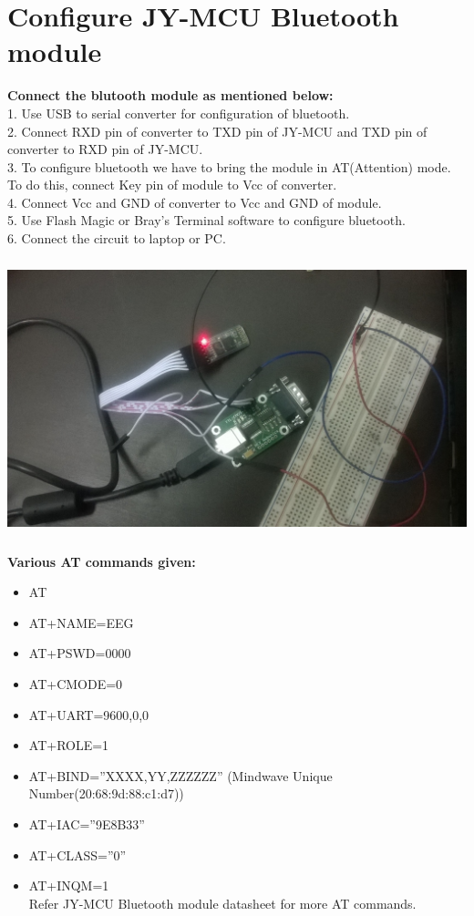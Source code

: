 \documentclass[a4 paper,12pt]{article}
\begin{document}
\begin{minipage}{0.98\textwidth}
	\section{Configure JY-MCU Bluetooth module}
	\vspace{-0.1in}
\textbf{Connect the blutooth module as mentioned below:}\\
1. Use USB to serial converter for configuration of bluetooth.\\
2. Connect RXD pin of converter to TXD pin of JY-MCU and TXD pin of converter to RXD pin of JY-MCU.\\
3. To configure bluetooth we have to bring the module in AT(Attention) mode. To do this, connect Key pin of module to Vcc of converter.\\
4. Connect Vcc and GND of converter to Vcc and GND of module.\\
5. Use Flash Magic or Bray's Terminal software to configure bluetooth.\\
6. Connect the circuit to laptop or PC.

\begin{center}
	\graphicspath{ {images/} }
	\includegraphics[width=15cm, height=8cm]{BT_Configure}
\end{center}

\textbf{Various AT commands given:}
\begin{itemize}
	\item AT \item AT+NAME=EEG\item AT+PSWD=0000\item AT+CMODE=0\item AT+UART=9600,0,0\item AT+ROLE=1\item AT+BIND=”XXXX,YY,ZZZZZZ” (Mindwave Unique Number(20:68:9d:88:c1:d7))\item AT+IAC=”9E8B33”\item AT+CLASS=”0”\item AT+INQM=1\\Refer JY-MCU Bluetooth module datasheet for more AT commands.\\
\end{itemize}
\end{minipage}
\end{document}
